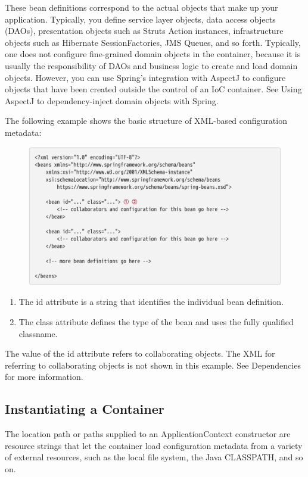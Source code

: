 These bean definitions correspond to the actual objects that make up your application. Typically,
you define service layer objects, data access objects (DAOs), presentation objects such as Struts
Action instances, infrastructure objects such as Hibernate SessionFactories, JMS Queues, and so
forth. Typically, one does not configure fine-grained domain objects in the container, because it is
usually the responsibility of DAOs and business logic to create and load domain objects. However,
you can use Spring’s integration with AspectJ to configure objects that have been created outside
the control of an IoC container. See Using AspectJ to dependency-inject domain objects with Spring.

The following example shows the basic structure of XML-based configuration metadata:

\begin{figure}[ht]
    \centering
    \includegraphics[width=1\linewidth]{./Figure/IMG_code_1.png}
  \end{figure}

  \begin{enumerate}
    \item The id attribute is a string that identifies the individual bean definition.
    \item The class attribute defines the type of the bean and uses the fully qualified classname.
\end{enumerate}

The value of the id attribute refers to collaborating objects. The XML for referring to collaborating
objects is not shown in this example. See Dependencies for more information.

\subsection{Instantiating a Container}
The location path or paths supplied to an ApplicationContext constructor are resource strings that
let the container load configuration metadata from a variety of external resources, such as the local
file system, the Java CLASSPATH, and so on.

